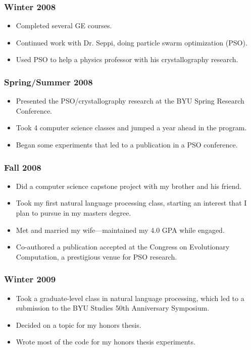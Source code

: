 \documentclass[onecolumn, 10pt]{article}
\begin{document}
\subsubsection*{Winter 2008}
\begin{itemize}
  \item Completed several GE courses.
  \item Continued work with Dr. Seppi, doing particle swarm optimization (PSO).
  \item Used PSO to help a physics professor with his crystallography research.
\end{itemize}
\subsubsection*{Spring/Summer 2008}
\begin{itemize}
  \item Presented the PSO/crystallography research at the BYU Spring Research
	Conference.
  \item Took 4 computer science classes and jumped a year ahead in the program.
  \item Began some experiments that led to a publication in a PSO conference.
\end{itemize}
\subsubsection*{Fall 2008}
\begin{itemize}
  \item Did a computer science capstone project with my brother and his friend.
  \item Took my first natural language processing class, starting an interest
	that I plan to pursue in my masters degree.
  \item Met and married my wife---maintained my 4.0 GPA while engaged.
  \item Co-authored a publication accepted at the Congress on Evolutionary
	Computation, a prestigious venue for PSO research.
\end{itemize}
\subsubsection*{Winter 2009}
\begin{itemize}
  \item Took a graduate-level class in natural language processing, which led
	to a submission to the BYU Studies 50th Anniversary Symposium.
  \item Decided on a topic for my honors thesis.
  \item Wrote most of the code for my honors thesis experiments.
\end{itemize}
\end{document}
